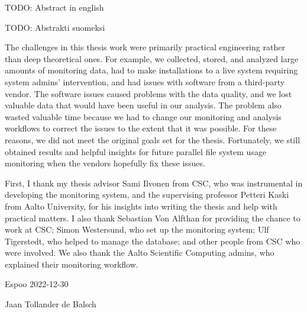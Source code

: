 \makecoverpage
\makecopyrightpage


\begin{abstractpage}[english]
TODO: Abstract in english
\end{abstractpage}



\begin{abstractpage}[finnish]
TODO: Abstrakti suomeksi
\end{abstractpage}


The challenges in this thesis work were primarily practical engineering rather than deep theoretical ones.
For example, we collected, stored, and analyzed large amounts of monitoring data, had to make installations to a live system requiring system admins' intervention, and had issues with software from a third-party vendor.
The software issues caused problems with the data quality, and we lost valuable data that would have been useful in our analysis.
The problem also wasted valuable time because we had to change our monitoring and analysis workflows to correct the issues to the extent that it was possible.
For these reasons, we did not meet the original goals set for the thesis.
Fortunately, we still obtained results and helpful insights for future parallel file system usage monitoring when the vendors hopefully fix these issues.

First, I thank my thesis advisor Sami Ilvonen from CSC, who was instrumental in developing the monitoring system, and the supervising professor Petteri Kaski from Aalto University, for his insights into writing the thesis and help with practical matters.
I also thank Sebastian Von Alfthan for providing the chance to work at CSC; Simon Westersund, who set up the monitoring system; Ulf Tigerstedt, who helped to manage the database; and other people from CSC who were involved.
We also thank the Aalto Scientific Computing admins, who explained their monitoring workflow.

\vspace{5cm}
Espoo 2022-12-30

\vspace{5mm}
{\hfill Jaan Tollander de Balsch \hspace{1cm}}

\newpage

\setcounter{tocdepth}{2}
\thesistableofcontents
